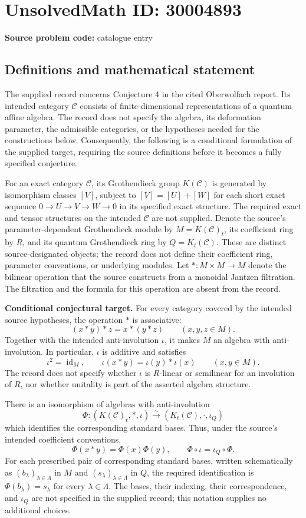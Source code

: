 \documentclass[11pt]{article}
\begin{document}
\section*{UnsolvedMath ID: 30004893}
\textbf{Source problem code:} catalogue entry
\subsection{Definitions and mathematical statement}
The supplied record concerns Conjecture 4 in the cited Oberwolfach report. Its intended category \(\mathcal C\) consists of finite-dimensional representations of a quantum affine algebra. The record does not specify the algebra, its deformation parameter, the admissible categories, or the hypotheses needed for the constructions below. Consequently, the following is a conditional formulation of the supplied target, requiring the source definitions before it becomes a fully specified conjecture.

For an exact category \(\mathcal C\), its Grothendieck group \(K(\mathcal C)\) is generated by isomorphism classes \([V]\), subject to \([V]=[U]+[W]\) for each short exact sequence \(0\to U\to V\to W\to0\) in its specified exact structure. The required exact and tensor structures on the intended \(\mathcal C\) are not supplied. Denote the source's parameter-dependent Grothendieck module by \(M=K(\mathcal C)_t\), its coefficient ring by \(R\), and its quantum Grothendieck ring by \(Q=K_t(\mathcal C)\). These are distinct source-designated objects; the record does not define their coefficient ring, parameter conventions, or underlying modules. Let \(*:M\times M\to M\) denote the bilinear operation that the source constructs from a monoidal Jantzen filtration. The filtration and the formula for this operation are absent from the record.

\textbf{Conditional conjectural target.} For every category covered by the intended source hypotheses, the operation \(*\) is associative:
\[
(x*y)*z=x*(y*z)\qquad(x,y,z\in M).
\]
Together with the intended anti-involution \(\iota\), it makes \(M\) an algebra with anti-involution. In particular, \(\iota\) is additive and satisfies
\[
\iota^2=\operatorname{id}_M,
\qquad
\iota(x*y)=\iota(y)*\iota(x)
\qquad(x,y\in M).
\]
The record does not specify whether \(\iota\) is \(R\)-linear or semilinear for an involution of \(R\), nor whether unitality is part of the asserted algebra structure.

There is an isomorphism of algebras with anti-involution
\[
\Phi:(K(\mathcal C)_t,*,\iota)\xrightarrow{\sim}(K_t(\mathcal C),\cdot,\iota_Q)
\]
which identifies the corresponding standard bases. Thus, under the source's intended coefficient conventions,
\[
\Phi(x*y)=\Phi(x)\Phi(y),
\qquad
\Phi\circ\iota=\iota_Q\circ\Phi.
\]
For each prescribed pair of corresponding standard bases, written schematically as \((b_\lambda)_{\lambda\in\Lambda}\) in \(M\) and \((s_\lambda)_{\lambda\in\Lambda}\) in \(Q\), the required identification is \(\Phi(b_\lambda)=s_\lambda\) for every \(\lambda\in\Lambda\). The bases, their indexing, their correspondence, and \(\iota_Q\) are not specified in the supplied record; this notation supplies no additional choices.
\end{document}
